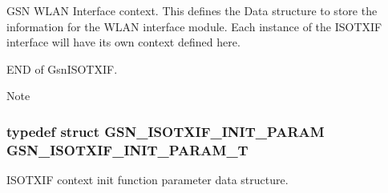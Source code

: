 GSN WLAN Interface context. This defines the Data structure to store the information for the WLAN interface module. Each instance of the ISOTXIF interface will have its own context defined here. 

END of GsnISOTXIF.

\begin{DoxyNote}{Note}

\end{DoxyNote}
\hypertarget{a00625_ga86fe1e652bfee5af4919a3021fa448fc}{
\subsubsection[{GSN\_\-ISOTXIF\_\-INIT\_\-PARAM\_\-T}]{\setlength{\rightskip}{0pt plus 5cm}typedef struct {\bf GSN\_\-ISOTXIF\_\-INIT\_\-PARAM} {\bf GSN\_\-ISOTXIF\_\-INIT\_\-PARAM\_\-T}}}
\label{a00625_ga86fe1e652bfee5af4919a3021fa448fc}


ISOTXIF context init function parameter data structure. 

